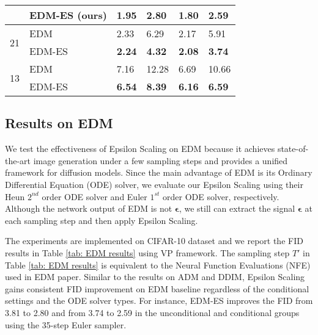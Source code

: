 \documentclass{article} \usepackage{iclr2024_conference,times}
\begin{document}
\begin{table*}[ht]
\begin{minipage}{0.46\linewidth}
\begin{center}
\begin{tabular}{@{}llllll@{}}
     & EDM-ES (ours) & \textbf{1.95} & \textbf{2.80} & \textbf{1.80} & \textbf{2.59} \\ \midrule
    \multirow{2}{*}{21} & EDM & 2.33 & 6.29 & 2.17 & 5.91 \\
     & EDM-ES & \textbf{2.24} & \textbf{4.32} & \textbf{2.08} & \textbf{3.74} \\ \midrule
    \multirow{2}{*}{13} & EDM & 7.16 & 12.28 & 6.69 & 10.66 \\
     & EDM-ES & \textbf{6.54} & \textbf{8.39} & \textbf{6.16} & \textbf{6.59} \\ \bottomrule
    \end{tabular}
    \end{center}
  \end{minipage}
\vskip -0.1in
\end{table*}





\subsection{Results on EDM}
We test the effectiveness of Epsilon Scaling on EDM \citep{karras2022elucidating} because it achieves state-of-the-art image generation under a few sampling steps and provides a unified framework for diffusion models. Since the main advantage of EDM is its Ordinary Differential Equation (ODE) solver, we evaluate our Epsilon Scaling using their Heun $2^{nd}$ order ODE solver \citep{ascher1998computer} and Euler $1^{st}$ order ODE solver, respectively. Although the network output of EDM is not $\pmb{\epsilon}$, we still can extract the signal $\pmb{\epsilon}$ at each sampling step and then apply Epsilon Scaling. 

The experiments are implemented on CIFAR-10 dataset and we report the FID results in Table \ref{tab: EDM results} using VP framework. The sampling step $T'$ in Table \ref{tab: EDM results} is equivalent to the Neural Function Evaluations (NFE) used in EDM paper. Similar to the results on ADM and DDIM, Epsilon Scaling gains consistent FID improvement on EDM baseline regardless of the conditional settings and the ODE solver types. For instance, EDM-ES improves the FID from 3.81 to 2.80 and from 3.74 to 2.59 in the unconditional and conditional groups using the 35-step Euler sampler.
\end{document}
